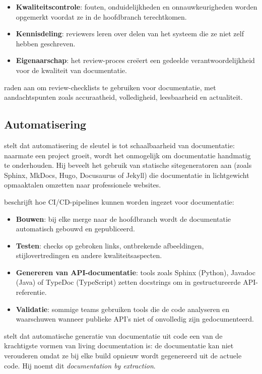 \begin{itemize}
    \item \textbf{Kwaliteitscontrole}: fouten, onduidelijkheden en onnauwkeurigheden worden opgemerkt voordat ze in de hoofdbranch terechtkomen.
    \item \textbf{Kennisdeling}: reviewers leren over delen van het systeem die ze niet zelf hebben geschreven.
    \item \textbf{Eigenaarschap}: het review-proces creëert een gedeelde verantwoordelijkheid voor de kwaliteit van documentatie.
\end{itemize}

\textcite{bhatti2021docsdevelopers} raden aan om review-checklists te gebruiken voor documentatie, met aandachtspunten zoals accuraatheid, volledigheid, leesbaarheid en actualiteit.

\subsection{Automatisering}
\textcite{etter2016moderntechwriting} stelt dat automatisering de sleutel is tot schaalbaarheid van documentatie: naarmate een project groeit, wordt het onmogelijk om documentatie handmatig te onderhouden. Hij beveelt het gebruik van statische sitegeneratoren aan (zoals Sphinx, MkDocs, Hugo, Docusaurus of Jekyll) die documentatie in lichtgewicht opmaaktalen omzetten naar professionele websites.

\textcite{gentle2017docslikecode} beschrijft hoe CI/CD-pipelines kunnen worden ingezet voor documentatie:

\begin{itemize}
    \item \textbf{Bouwen}: bij elke merge naar de hoofdbranch wordt de documentatie automatisch gebouwd en gepubliceerd.
    \item \textbf{Testen}: checks op gebroken links, ontbrekende afbeeldingen, stijlovertredingen en andere kwaliteitsaspecten.
    \item \textbf{Genereren van API-documentatie}: tools zoals Sphinx (Python), Javadoc (Java) of TypeDoc (TypeScript) zetten docstrings om in gestructureerde API-referentie.
    \item \textbf{Validatie}: sommige teams gebruiken tools die de code analyseren en waarschuwen wanneer publieke API's niet of onvolledig zijn gedocumenteerd.
\end{itemize}

\textcite{martraire2019livingdocumentation} stelt dat automatische generatie van documentatie uit code een van de krachtigste vormen van living documentation is: de documentatie kan niet verouderen omdat ze bij elke build opnieuw wordt gegenereerd uit de actuele code. Hij noemt dit \textit{documentation by extraction}.

